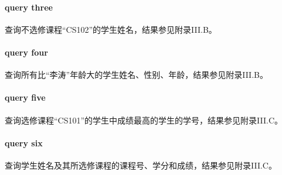 \documentclass[UTF8]{ctexart}
\begin{document}

    \paragraph{query three}
    查询不选修课程“CS102”的学生姓名，结果参见附录III.B。


    \paragraph{query four}
    查询所有比“李涛”年龄大的学生姓名、性别、年龄，结果参见附录III.B。


    \paragraph{query five}
    查询选修课程“CS101”的学生中成绩最高的学生的学号，结果参见附录III.C。


    \paragraph{query six}
    查询学生姓名及其所选修课程的课程号、学分和成绩，结果参见附录III.C。

\end{document}

